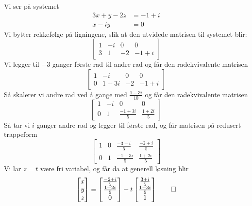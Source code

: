 \begin{ex}
Vi ser på systemet
\begin{align*}
	3x + y - 2z &= -1+i \\
	  x - iy     \quad\quad\;    &= 0
\end{align*}
Vi bytter rekkefølge på ligningene, slik at 
den utvidede matrisen til systemet blir:
\[
\left[
\begin{array}{ccc|c}
  1 & -i & 0 & 0 \\
  3 & 1 & -2 & -1+i
\end{array}
\right]
\]
Vi legger til $-3$ ganger første rad til andre rad og får den radekvivalente matrisen
\[
\left[
\begin{array}{ccc|c}
  1 & -i & 0 & 0 \\
  0 & 1+3i & -2 & -1+i
\end{array}
\right]
\]
Så skalerer vi andre rad ved å gange med $\frac{1-3i}{10}$ og får den radekvivalente matrisen
\[
\left[
\begin{array}{ccc|c}
  1 & -i & 0 & 0 \\
  0 & 1 & \frac{-1+3i}{5} & \frac{1+2i}{5}
\end{array}
\right]
\]
Så tar vi $i$ ganger andre rad og legger til første rad, og får matrisen på redusert trappeform
\[
\left[
\begin{array}{ccc|c}
  1 & 0 & \frac{-3-i}{5} & \frac{-2+i}{5} \\
  0 & 1 & \frac{-1+3i}{5} & \frac{1+2i}{5}
\end{array}
\right]
\]
Vi lar $z=t$ være fri variabel, og får da at generell løsning blir
\[
\begin{bmatrix} x \\ y \\ z \end{bmatrix} = \begin{bmatrix} \frac{-2+i}{5} \\ \frac{1+2i}{5} \\ 0 \end{bmatrix} + t \begin{bmatrix} \frac{3+i}{5} \\ \frac{1-3i}{5} \\ 1 \end{bmatrix} \qedhere
\]
\end{ex} 


\kapittelslutt
